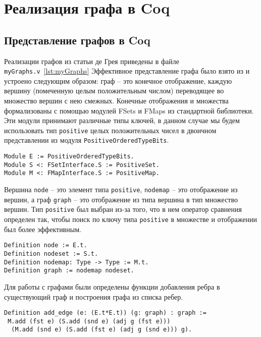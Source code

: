 

\chapter{Реализация графа в Coq}

\section{Представление графов в Coq}
Реализации графов из статьи де Грея приведены в файле {\tt myGraphs.v}~\ref{lst:myGraphs}
Эффективное представление графа было взято из\cite{VFA} и устроено
следующим образом: граф -- это конечное отображение, каждую вершину
(помеченную целым положительным числом) переводящее во
множество вершин с нею смежных. Конечные отображения и множества
формализованы с помощью модулей FSets и FMaps из стандартной
библиотеки. Эти модули принимают различные типы ключей, в данном случае мы будем использовать тип {\tt positive} целых положительных чисел в двоичном представлении из модуля {\tt PositiveOrderedTypeBits}.

\begin{verbatim}
Module E := PositiveOrderedTypeBits.
Module S <: FSetInterface.S := PositiveSet.
Module M <: FMapInterface.S := PositiveMap.
\end{verbatim} 

Вершина {\tt node} -- это элемент типа {\tt positive}, {\tt nodemap} -- это отображение из вершин, а граф {\tt graph} -- это отображение из типа вершина в тип множество вершин. Тип {\tt positive} был выбран из-за того, что в нем оператор сравнения определен так, чтобы поиск по ключу типа {\tt positive} в множестве и отображении был более эффективным.

\begin{verbatim}
Definition node := E.t.
Definition nodeset := S.t.
Definition nodemap: Type -> Type := M.t.
Definition graph := nodemap nodeset.
\end{verbatim}

Для работы с графами были определены функции добавления ребра в существующий граф и построения графа из списка ребер.

\begin{verbatim}
Definition add_edge (e: (E.t*E.t)) (g: graph) : graph :=
 M.add (fst e) (S.add (snd e) (adj g (fst e))) 
  (M.add (snd e) (S.add (fst e) (adj g (snd e))) g).
\end{verbatim}

